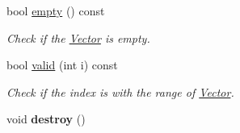 \begin{DoxyCompactItemize}
bool \hyperlink{class_magnum_1_1_vector_a1f348ec2c7341adc0d72fed4cd97bef0}{empty} () const 
\begin{DoxyCompactList}\small\item\em Check if the \hyperlink{class_magnum_1_1_vector}{Vector} is empty. \end{DoxyCompactList}\item 
bool \hyperlink{class_magnum_1_1_vector_a80fa55e044b6c81df801db05bddccf62}{valid} (int i) const 
\begin{DoxyCompactList}\small\item\em Check if the index is with the range of \hyperlink{class_magnum_1_1_vector}{Vector}. \end{DoxyCompactList}\item 
void {\bfseries destroy} ()\hypertarget{class_magnum_1_1_vector_a1a30461c80a9472a88654cbbfec7b05f}{}\label{class_magnum_1_1_vector_a1a30461c80a9472a88654cbbfec7b05f}


\end{DoxyCompactItemize}
